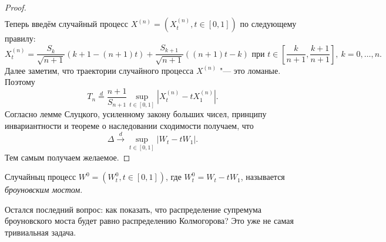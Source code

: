\begin{proof}
\begin{align}
	\end{align} 
	Теперь введём случайный процесс $X^{(n)} = (X^{(n)}_{t}, t \in [0, 1])$ по следующему правилу:
	\begin{equation}
		X^{(n)}_{t} = \frac{S_{k}}{\sqrt{n + 1}}(k + 1 - (n + 1)t) + \frac{S_{k + 1}}{\sqrt{n + 1}}((n + 1)t - k) \text{ при } t \in \left[\frac{k}{n + 1}, \frac{k + 1}{n + 1}\right],\ k = 0, \ldots, n.
	\end{equation}
	Далее заметим, что траектории случайного процесса $X^{(n)}$ "--- это ломаные. Поэтому
	\begin{equation}
		T_{n} \stackrel{d}{=} \frac{n + 1}{S_{n + 1}}\sup_{t \in [0, 1]}|X_{t}^{(n)} - tX_{1}^{(n)}|.
	\end{equation}
	Согласно лемме Слуцкого, усиленному закону больших чисел, принципу инвариантности и теореме о наследовании сходимости получаем, что
	\begin{equation}
		\Delta \xrightarrow{d} \sup_{t \in [0, 1]}|W_{t} - tW_{1}|.
	\end{equation}
	Тем самым получаем желаемое.
\end{proof}	
\begin{definition}
	Случайныц процесс $W^{0} = (W_{t}^{0}, t \in [0, 1])$, где $W_{t}^{0} = W_{t} - tW_{1}$, называется \emph{броуновским мостом}.
\end{definition}
Остался последний вопрос: как показать, что распределение супремума броуновского моста будет равно распределению Колмогорова? Это уже не самая тривиальная задача. 
